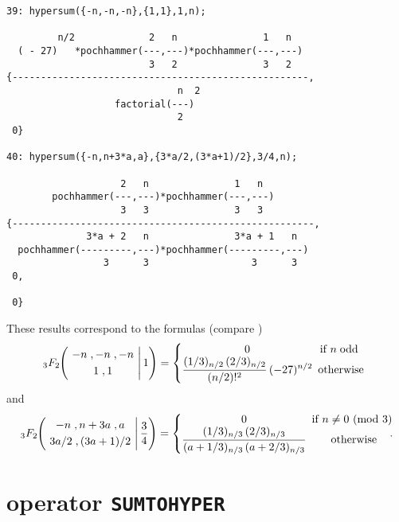 {\small
\begin{verbatim}
39: hypersum({-n,-n,-n},{1,1},1,n);

         n/2             2   n               1   n
  ( - 27)   *pochhammer(---,---)*pochhammer(---,---)
                         3   2               3   2
{----------------------------------------------------,
                              n  2
                   factorial(---)
                              2
 0}

40: hypersum({-n,n+3*a,a},{3*a/2,(3*a+1)/2},3/4,n);

                    2   n               1   n
        pochhammer(---,---)*pochhammer(---,---)
                    3   3               3   3
{-----------------------------------------------------,
              3*a + 2   n               3*a + 1   n
  pochhammer(---------,---)*pochhammer(---------,---)
                 3      3                  3      3
 0,

 0}
\end{verbatim}
}\noindent
These results correspond to the formulas (compare \cite{Koepf})
\[
_3 F_2\left.
\!\!
\left(
\!\!\!\!
\begin{array}{c}
\multicolumn{1}{c}{\begin{array}{c}
-n\;, -n\;, -n
\end{array}}\\[1mm]
\multicolumn{1}{c}{\begin{array}{c}
1 \;, 1
            \end{array}}\end{array}
\!\!\!\!
\right| 1\right)
=
\funkdef{0}{n\;\mbox{odd}}{\displaystyle
\frac{(1/3)_{n/2}\,(2/3)_{n/2}}{(n/2)!^2}\,(-27)^{n/2}
}
\]
and
\[
_3 F_2\left.
\!\!
\left(
\!\!\!\!
\begin{array}{c}
\multicolumn{1}{c}{\begin{array}{c}
-n\;, n+3a\;, a
\end{array}}\\[1mm]
\multicolumn{1}{c}{\begin{array}{c}
3a/2\;,(3a+1)/2
            \end{array}}\end{array}
\!\!\!\!
\right| \frac{3}{4}\right)
=
\funkdef{0}{n\neq 0 {\mbox{ (mod }} 3)}{\displaystyle
\frac{(1/3)_{n/3}\,(2/3)_{n/3}}
{(a+1/3)_{n/3}\,(a+2/3)_{n/3}}
}
\!\!\!\!\!\!\!\!.
\]

\section{\REDUCE{} operator {\tt SUMTOHYPER}}

